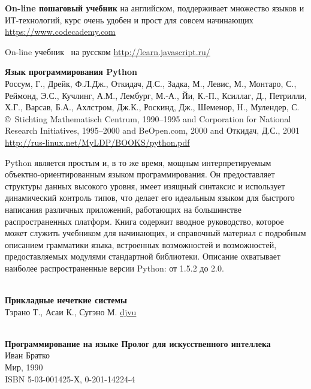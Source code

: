 \begin{thebibliography}{99}

\textbf{On-line пошаговый учебник \js} на английском, поддерживает множество
языков и ИТ-технологий, курс очень удобен и прост для совсем начинающих
\url{https://www.codecademy.com}

On-line учебник \js\ на русском
\url{http://learn.javascript.ru/}


\textbf{Язык программирования Python}\\
Россум, Г., Дрейк, Ф.Л.Дж., Откидач, Д.С., Задка, М.,  Левис, М.,  Монтаро, С.,
Реймонд, Э.С., Кучлинг, А.М.,  Лембург, М.-А.,  Йи, К.-П.,  Ксиллаг, Д.,
Петрилли, Х.Г., Варсав, Б.А.,  Ахлстром, Дж.К.,  Роскинд, Дж.,  Шеменор, Н.,
Мулендер, С.\\
\copyright\ Stichting Mathematisch Centrum, 1990–1995
and Corporation for National Research Initiatives, 1995–2000
and BeOpen.com, 2000
and Откидач, Д.С., 2001 \\
\url{http://rus-linux.net/MyLDP/BOOKS/python.pdf}

Python является простым и, в то же время, мощным интерпретируемым
объектно-ориентированным языком программирования. Он предоставляет структуры
данных высокого уровня, имеет изящный синтаксис и использует динамический
контроль типов, что делает его идеальным языком для быстрого написания различных
приложений, работающих на большинстве распространенных платформ. Книга содержит
вводное руководство, которое может служить учебником для начинающих, и
справочный материал с подробным описанием грамматики языка, встроенных
возможностей и возможностей, предоставляемых модулями стандартной библиотеки.
Описание охватывает наиболее распространенные версии Python: от 1.5.2 до 2.0.


\ \\
\textbf{Прикладные нечеткие системы}\\
Тэрано Т., Асаи К., Сугэно М. 
\href{https://drive.google.com/file/d/0B0u4WeMjO894cWFaSkVZR1MybGc/view?usp=sharing}{djvu}

\ \\
\textbf{Программирование на языке Пролог для искусственного интеллека}\\
Иван Братко\\
Мир, 1990\\ ISBN 5-03-001425-Х, 0-201-14224-4


\end{thebibliography}

